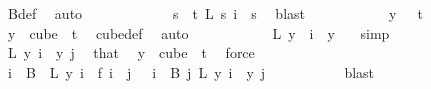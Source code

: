 \begin{isabellebody}
\ B{\isacharunderscore}{\kern0pt}def\ \isamarkupfalse%
\ auto\ \isanewline
\ \ \ \ \ \ \ \ \isamarkupfalse%
\ \isamarkupfalse%
\ {\isachardoublequoteopen}{\isacharparenleft}{\kern0pt}{\isasymforall}s\ {\isacharless}{\kern0pt}\ t{\isachardot}{\kern0pt}\ L\ s\ i\ {\isacharequal}{\kern0pt}\ s{\isacharparenright}{\kern0pt}{\isachardoublequoteclose}\ \isamarkupfalse%
\ blast\isanewline
\ \ \ \ \ \ \ \ \isamarkupfalse%
\ \isamarkupfalse%
\ {\isachardoublequoteopen}y\ {}\ {\isacharless}{\kern0pt}\ t{\isachardoublequoteclose}\ \isamarkupfalse%
\ {\isacartoucheopen}y\ {\isasymin}\ cube\ {}\ t{\isacartoucheclose}\ \isamarkupfalse%
\ cube{\isacharunderscore}{\kern0pt}def\ \isamarkupfalse%
\ auto\isanewline
\ \ \ \ \ \ \ \ \isamarkupfalse%
\ \isamarkupfalse%
\ {\isachardoublequoteopen}L\ {\isacharparenleft}{\kern0pt}y\ {}{\isacharparenright}{\kern0pt}\ i\ {\isacharequal}{\kern0pt}\ y\ {}{\isachardoublequoteclose}\ \isamarkupfalse%
\ simp\isanewline
\ \ \ \ \ \ \ \ \isamarkupfalse%
\ \isamarkupfalse%
\ {\isachardoublequoteopen}{\isacharquery}{\kern0pt}L\ y\ i\ {\isacharequal}{\kern0pt}\ y\ j{\isachardoublequoteclose}\ \isamarkupfalse%
\ that\ \isamarkupfalse%
\ {\isacartoucheopen}y\ {\isasymin}\ cube\ {}\ t{\isacartoucheclose}\ \isamarkupfalse%
\ force\isanewline
\ \ \ \ \ \ \isamarkupfalse%
\isanewline
\isanewline
\ \ \ \ \ \ \isamarkupfalse%
\ \isamarkupfalse%
\ {\isachardoublequoteopen}{\isacharparenleft}{\kern0pt}{\isasymforall}i\ {\isasymin}\ B\ {}{\isachardot}{\kern0pt}\ {\isacharquery}{\kern0pt}L\ y\ i\ {\isacharequal}{\kern0pt}\ {\isacharquery}{\kern0pt}f\ i{\isacharparenright}{\kern0pt}\ {\isasymand}\ {\isacharparenleft}{\kern0pt}{\isasymforall}j\ {\isacharless}{\kern0pt}\ {}{\isachardot}{\kern0pt}\ {\isasymforall}i\ {\isasymin}\ B\ j{\isachardot}{\kern0pt}\ {\isacharparenleft}{\kern0pt}{\isacharquery}{\kern0pt}L\ y{\isacharparenright}{\kern0pt}\ i\ {\isacharequal}{\kern0pt}\ y\ j{\isacharparenright}{\kern0pt}{\isachardoublequoteclose}\ \isanewline
\ \ \ \ \ \ \ \ \isamarkupfalse%
\ blast\isanewline
\ \ \ \ \isamarkupfalse%
\isanewline
\ \ \isacommand{{\isacharbraceright}{\kern0pt}}\isamarkupfalse%

\end{isabellebody}
